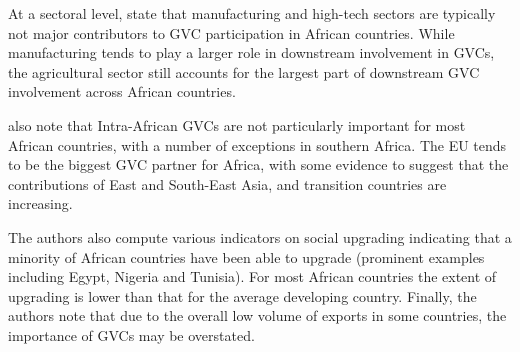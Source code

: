 \documentclass[a4paper]{article}
\begin{document}
At a sectoral level, \citet{foster2015global} state that manufacturing and high-tech sectors are typically not major contributors to GVC participation in African countries. While manufacturing tends to play a larger role in downstream involvement in GVCs, the agricultural sector still accounts for the largest part of downstream GVC involvement across African countries. \newline %

\citet{foster2015global} also note that Intra-African GVCs are not particularly important for most African countries, with a number of exceptions in southern Africa. The EU tends to be the biggest GVC partner for Africa, with some evidence to suggest that the contributions of East and South-East Asia, and transition countries are increasing. \newline



The authors also compute various indicators on social upgrading indicating that a minority of African countries have been able to upgrade (prominent examples including Egypt, Nigeria and Tunisia). For most African countries the extent of upgrading is lower than that for the average developing country. %
Finally, the authors note that due to the overall low volume of exports in some countries, the importance  of GVCs may be overstated. \newline
\end{document}

